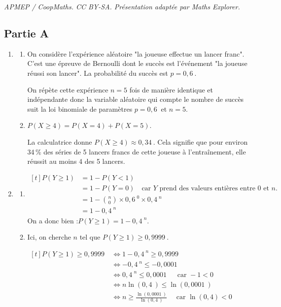 \documentclass[10pt]{article}
\providecommand{\np}[2][]{{#2~#1}}
\providecommand{\ds}{\displaystyle}
\begin{document}
\noindent\textit{APMEP / CoopMaths. CC BY-SA. Présentation adaptée par Maths Explorer.}\par\medskip
\subsection*{Partie A}

	\medskip

	\begin{enumerate}
		\item \begin{enumerate}
			\item On considère l'expérience aléatoire "la joueuse effectue un lancer franc". C'est une épreuve de Bernoulli dont le succès est l'événement "la joueuse réussi son lancer". La probabilité du succès est $p=\np{0,6}$.

			On répète cette expérience $n=5$ fois de manière identique et indépendante donc la variable aléatoire qui compte le nombre de succès suit la loi binomiale de paramètres $p=\np{0,6}$ et $n=5$.

			\item $P(X \geqslant 4)=P(X=4) + P(X=5)$.

			La calculatrice donne $P(X \geqslant 4) \approx \np{0,34}$. Cela signifie que pour environ 34\,\% des séries de 5 lancers francs de cette joueuse à l'entraînement, elle réussit au moins 4 des 5 lancers.
		\end{enumerate}

		\item \begin{enumerate}
			\item $\ds \begin{aligned}[t] P(Y \geqslant 1) &=1 - P(Y < 1) \\
				& =1 - P(Y=0)\quad \text{car $Y$ prend des valeurs entières entre 0 et $n$.}\\
				& = 1 - \binom{n}{0} \times \np{0,6}^0 \times \np{0,4}^n\\
				& =1 - \np{0,4}^n
			\end{aligned}$
			On a donc bien :\quad $P(Y \geqslant 1)  =1 - \np{0,4}^n$.

			\item Ici, on cherche $n$ tel que $P(Y \geqslant 1) \geqslant \np{0,9999}$.

			$\begin{aligned}[t] P(Y \geqslant 1) \geqslant \np{0,9999} &\iff 1- \np{0,4}^n \geqslant \np{0,9999}\\
			& \iff -\np{0,4}^n \leqslant -\np{0,0001}\\
			& \iff \np{0,4}^n \leqslant \np{0,0001}\quad \text{ car } -1 < 0\\
			& \iff n \ln\left( \np{0,4} \right) \leqslant \ln \left( \np{0,0001} \right)\\
			& \iff n \geqslant \frac{\ln \left( \np{0,0001} \right)}{\ln\left( \np{0,4} \right)} \quad \text{ car } \ln(0,4) < 0
			\end{aligned}$


\end{enumerate}
\end{enumerate}
\end{document}
